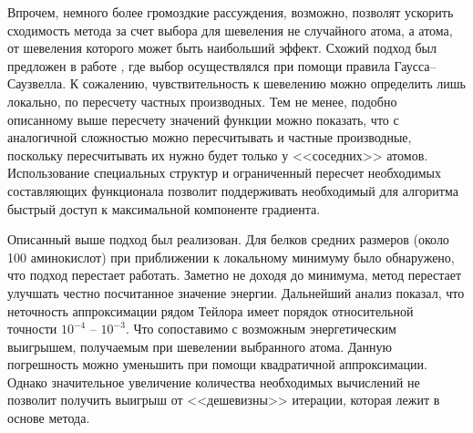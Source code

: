   Впрочем, немного более громоздкие рассуждения, возможно, позволят ускорить 
  сходимость метода за счет выбора для шевеления не случайного атома, а атома, 
  от шевеления которого может быть наибольший эффект. Схожий подход был предложен в работе \cite{nutini2015coordinate}, где выбор осуществлялся при помощи правила 
  Гаусса--Саузвелла. К сожалению, чувствительность к шевелению можно определить лишь 
  локально, по пересчету частных производных. Тем не менее, подобно 
  описанному выше пересчету значений функции можно показать, что с аналогичной 
  сложностью можно пересчитывать и частные производные, поскольку пересчитывать их 
  нужно будет только у <<соседних>> атомов. Использование специальных структур и ограниченный пересчет необходимых составляющих функционала позволит поддерживать необходимый для алгоритма быстрый доступ к максимальной компоненте градиента.

  Описанный выше подход был реализован. Для белков средних размеров (около 100 аминокислот) при приближении к локальному минимуму было обнаружено, что подход перестает работать. Заметно не доходя до минимума, метод перестает улучшать честно посчитанное значение энергии. Дальнейший анализ показал, что неточность аппроксимации рядом Тейлора имеет порядок относительной точности $10^{-4}$ -- $10^{-3}$. Что сопоставимо с возможным энергетическим выигрышем, получаемым при шевелении выбранного атома. Данную погрешность можно уменьшить при помощи квадратичной аппроксимации. Однако значительное увеличение количества необходимых вычислений не позволит получить выигрыш от <<дешевизны>> итерации, которая лежит в основе метода. 

